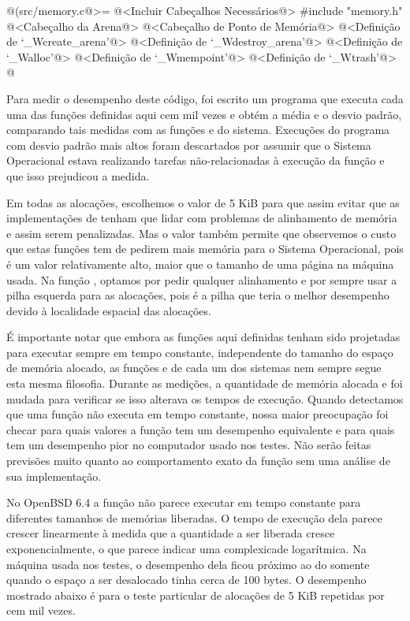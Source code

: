 \iniciocodigo
@(src/memory.c@>=
@<Incluir Cabeçalhos Necessários@>
#include "memory.h"
@<Cabeçalho da Arena@>
@<Cabeçalho de Ponto de Memória@>
@<Definição de `\_Wcreate\_arena'@>
@<Definição de `\_Wdestroy\_arena'@>
@<Definição de `\_Walloc'@>
@<Definição de `\_Wmempoint'@>
@<Definição de `\_Wtrash'@>
@
\fimcodigo


Para medir o desempenho deste código, foi escrito um programa que
executa cada uma das funções definidas aqui cem mil vezes e obtém
a média e o desvio padrão, comparando tais medidas com as
funções  e  do sistema. Execuções
do programa com desvio padrão mais altos foram descartados por assumir
que o Sistema Operacional estava realizando tarefas não-relacionadas à
execução da função e que isso prejudicou a medida.

Em todas as alocações, escolhemos o valor de 5 KiB para que assim
evitar que as implementações de  tenham que lidar
com problemas de alinhamento de memória e assim serem penalizadas. Mas
o valor também permite que observemos o custo que estas funções tem de
pedirem mais memória para o Sistema Operacional, pois é um valor
relativamente alto, maior que o tamanho de uma página na máquina
usada. Na função , optamos por pedir qualquer
alinhamento e por sempre usar a pilha esquerda para as alocações, pois
é a pilha que teria o melhor desempenho devido à localidade espacial
das alocações.

É importante notar que embora as funções aqui definidas tenham sido
projetadas para executar sempre em tempo constante, independente do
tamanho do espaço de memória alocado, as funções 
e  de cada um dos sistemas nem sempre segue esta
mesma filosofia. Durante as medições, a quantidade de memória alocada
e foi mudada para verificar se isso alterava os tempos de
execução. Quando detectamos que uma função não executa em tempo
constante, nossa maior preocupação foi checar para quais valores a
função tem um desempenho equivalente e para quais tem um desempenho
pior no computador usado nos testes. Não serão feitas previsões muito
quanto ao comportamento exato da função sem uma análise de sua
implementação.


No OpenBSD 6.4 a função  não parece executar em tempo
constante para diferentes tamanhos de memórias liberadas. O tempo de
execução dela parece crescer linearmente à medida que a quantidade a
ser liberada cresce exponencialmente, o que parece indicar uma
complexicade logarítmica. Na máquina usada nos testes, o desempenho
dela ficou próximo ao do  somente quando o espaço a
ser desalocado tinha cerca de 100 bytes. O desempenho mostrado
abaixo é para o teste particular de alocações de 5 KiB repetidas por
cem mil vezes.


